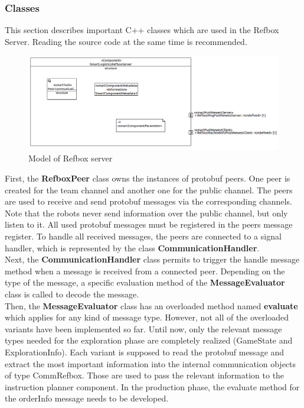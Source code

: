 \subsubsection{Classes}

This section describes important C++ classes which are used in the Refbox Server. Reading the source code at the same time is recommended.\\

\begin{figure}[!h]
\centering
\includegraphics[width=\linewidth]{pic/component_refbox_server.png}
\caption{Model of Refbox server}
\label{fig:modelRefboxServer}
\end{figure}

First, the \textbf{RefboxPeer} class owns the instances of protobuf peers. One peer is created for the team channel and another one for the public channel. The peers are used to receive and send protobuf messages via the corresponding channels. Note that the robots never send information over the public channel, but only listen to it. All used protobuf messages must be registered in the peers message register. To handle all received messages, the peers are connected to a signal handler, which is represented by the class \textbf{CommunicationHandler}. \\

Next, the \textbf{CommunicationHandler} class permits to trigger the handle message method when a message is received from a connected peer. Depending on the type of the message, a specific evaluation method of the \textbf{MessageEvaluator} class is called to decode the message.\\

Then, the \textbf{MessageEvaluator} class has an overloaded method named \textbf{evaluate} which applies for any kind of message type. However, not all of the overloaded variants have been implemented so far. Until now, only the relevant message types needed for the exploration phase are completely realized (GameState and ExplorationInfo). Each variant is supposed to read the protobuf message and extract the most important information into the internal communication objects of type CommRefbox. Those are used to pass the relevant information to the instruction planner component. In the production phase, the evaluate method for the orderInfo message needs to be developed.\\

